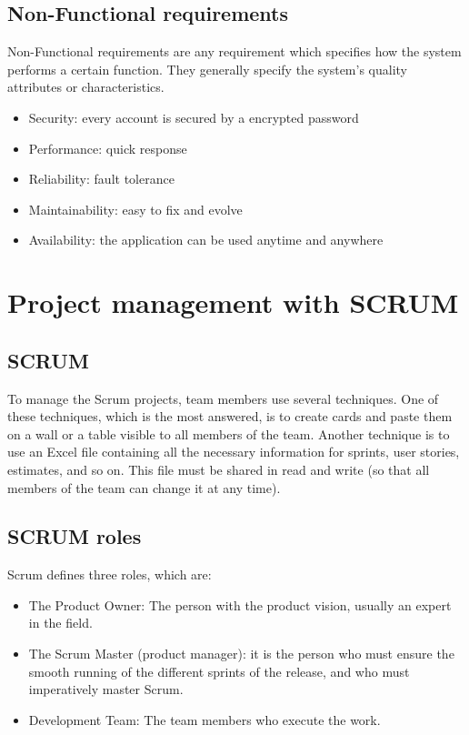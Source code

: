 \documentclass[12pt,a4paper]{report}
\begin{document}
	\subsection{Non-Functional requirements}
	Non-Functional requirements are any requirement which specifies how the system performs a certain function. They generally specify the system’s quality attributes or characteristics.
	\begin{itemize}
		\item Security: every account is secured by a encrypted password 
		\item Performance: quick response
		\item Reliability: fault tolerance
		\item Maintainability: easy to fix and evolve
		\item Availability: the application can be used anytime and anywhere
		
	\end{itemize}
	\section{Project management with SCRUM}
	\subsection{SCRUM}
	To manage the Scrum projects, team members use several techniques. One of these techniques, which is the most answered, is to create cards and paste them on a wall or a table visible to all members of the team. Another technique is to use an Excel file containing all the necessary information for sprints, user stories, estimates, and so on. This file must be shared in read and write (so that all members of the team can change it at any time).
	\subsection{SCRUM roles }
	Scrum defines three roles, which are:
	\begin{itemize}
		\item The Product Owner: The person with the product vision, usually an expert in the field.
		\item The Scrum Master (product manager): it is the person who must ensure the smooth running of the different sprints of the release, and who must imperatively master Scrum.
		\item Development Team: The team members who execute the work.
		
	\end{itemize}
\end{document}
